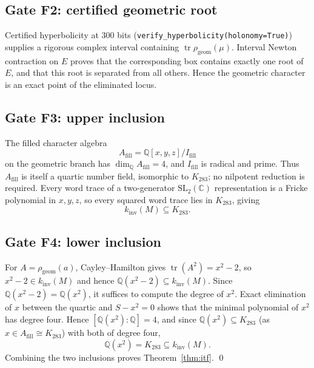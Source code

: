 \documentclass[11pt,a4paper]{article}
\theoremstyle{definition}
\theoremstyle{remark}
\newcommand{\tr}{\operatorname{tr}}
\newcommand{\kinv}{k_{\mathrm{inv}}}
\newcommand{\SLtwo}{\mathrm{SL}_2(\mathbb{C})}
\newcommand{\Q}{\mathbb{Q}}
\begin{document}
\subsection{Gate F2: certified geometric root}

Certified hyperbolicity at $300$ bits
(\texttt{verify\_hyperbolicity(holonomy=True)}) supplies a rigorous
complex interval containing $\tr\rho_{\mathrm{geom}}(\mu)$. Interval
Newton contraction on $E$ proves that the corresponding box contains
exactly one root of $E$, and that this root is separated from all
others. Hence the geometric character is an exact point of the
eliminated locus.

\subsection{Gate F3: upper inclusion}

The filled character algebra
\begin{equation}
A_{\mathrm{fill}} = \Q[x,y,z]/I_{\mathrm{fill}}
\end{equation}
on the geometric branch has $\dim_\Q A_{\mathrm{fill}} = 4$, and
$I_{\mathrm{fill}}$ is radical and prime. Thus $A_{\mathrm{fill}}$ is
itself a quartic number field, isomorphic to $K_{283}$; no nilpotent
reduction is required. Every word trace of a two-generator $\SLtwo$
representation is a Fricke polynomial in $x,y,z$, so every squared
word trace lies in $K_{283}$, giving
\begin{equation}
\kinv(M) \subseteq K_{283}.
\end{equation}

\subsection{Gate F4: lower inclusion}

For $A = \rho_{\mathrm{geom}}(a)$, Cayley--Hamilton gives
$\tr(A^2) = x^2 - 2$, so $x^2 - 2 \in \kinv(M)$ and hence
$\Q(x^2-2) \subseteq \kinv(M)$. Since $\Q(x^2-2) = \Q(x^2)$, it suffices
to compute the degree of $x^2$. Exact elimination of
$x$ between the quartic and $S - x^2 = 0$ shows that the minimal
polynomial of $x^2$ has degree four. Hence
$[\Q(x^2):\Q] = 4$, and since $\Q(x^2) \subseteq K_{283}$ (as $x \in A_{\mathrm{fill}} \cong K_{283}$) with both of
degree four,
\begin{equation}
\Q(x^2) = K_{283} \subseteq \kinv(M).
\end{equation}
Combining the two inclusions proves Theorem~\ref{thm:itf}. \qed
\end{document}
